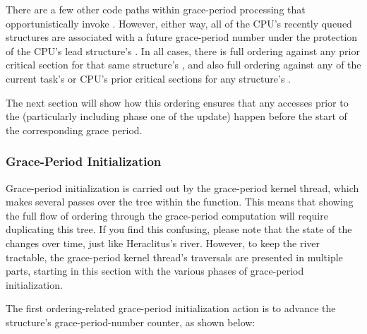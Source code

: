 There are a few other code paths within grace-period processing that
opportunistically invoke .
However, either way,
all of the CPU's recently queued  structures are associated
with a future grace-period number under the protection of the CPU's lead
 structure's .
In all cases, there is full
ordering against any prior critical section for that same 
structure's , and also full ordering against any of the
current task's or CPU's prior critical sections for any 
structure's .

The next section will show how this ordering ensures that any accesses
prior to the  (particularly including phase one of the
update) happen before the start of the corresponding grace period.

\QuickQuizEnd

\subsubsection{Grace-Period Initialization}
\label{sec:rcu:memorder:Grace-Period Initialization}

Grace-period initialization is carried out by the grace-period kernel
thread, which makes several passes over the  tree within the
 function.
This means that showing the full flow of
ordering through the grace-period computation will require duplicating
this tree.
If you find this confusing, please note that the state of the
 changes over time, just like Heraclitus's river.
However,
to keep the  river tractable, the grace-period kernel
thread's traversals are presented in multiple parts, starting in this
section with the various phases of grace-period initialization.

The first ordering-related grace-period initialization action is to
advance the  structure's  grace-period-number
counter, as shown below:

\begin{center}
\end{center}

